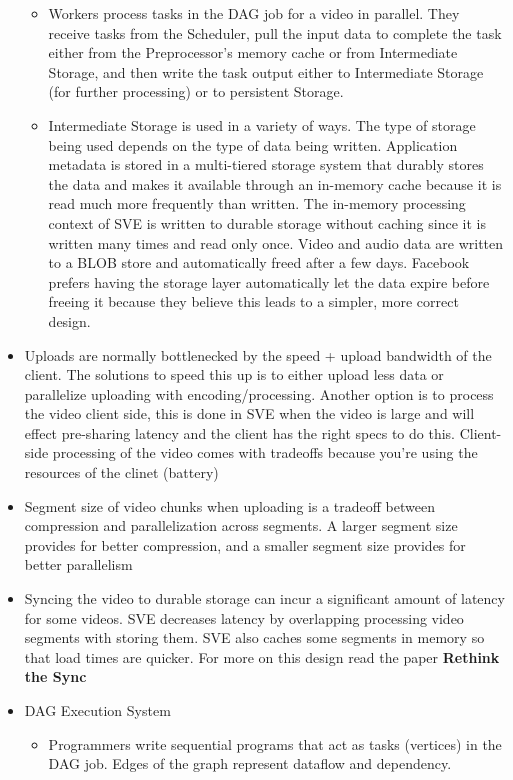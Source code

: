 \documentclass[a4paper]{article}
\begin{document}
\begin{itemize}
\begin{itemize}
\item Workers process tasks in the DAG job for a video in parallel. They receive tasks from the Scheduler, pull the input data to complete the task either from the Preprocessor's memory cache or from Intermediate Storage, and then write the task output either to Intermediate Storage (for further processing) or to persistent Storage.

\item Intermediate Storage is used in a variety of ways. The type of storage being used depends on the type of data being written. Application metadata is stored in a multi-tiered storage system that durably stores the data and makes it available through an in-memory cache because it is read much more frequently than written. The in-memory processing context of SVE is written to durable storage without caching since it is written many times and read only once. Video and audio data are written to a BLOB store and automatically freed after a few days. Facebook prefers having the storage layer automatically let the data expire before freeing it because they believe this leads to a simpler, more correct design.
\end{itemize}

\item Uploads are normally bottlenecked by the speed + upload bandwidth of the client. The solutions to speed this up is to either upload less data or parallelize uploading with encoding/processing. Another option is to process the video client side, this is done in SVE when the video is large and will effect pre-sharing latency and the client has the right specs to do this. Client-side processing of the video comes with tradeoffs because you're using the resources of the clinet (battery)

\item Segment size of video chunks when uploading is a tradeoff between compression and parallelization across segments. A larger segment size provides for better compression, and a smaller segment size provides for better parallelism

\item Syncing the video to durable storage can incur a significant amount of latency for some videos. SVE decreases latency by overlapping processing video segments with storing them. SVE also caches some segments in memory so that load times are quicker. For more on this design read the paper \textbf{Rethink the Sync}

\item DAG Execution System
\begin{itemize}
\item Programmers write sequential programs that act as tasks (vertices) in the DAG job. Edges of the graph represent dataflow and dependency.


\end{itemize}
\end{itemize}
\end{document}
